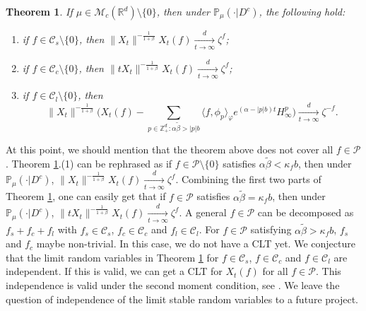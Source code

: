 \documentclass[12pt,a4paper]{amsart}
\theoremstyle{plain}
\newtheorem{thm}{Theorem}[section]
\theoremstyle{definition}
\numberwithin{equation}{section}
\begin{document}
\begin{thm}
  \label{thm:M}
 If $\mu\in \mathcal M_c(\mathbb R^d)\setminus \{0\}$, then under $\mathbb{P}_{\mu}(\cdot|D^c)$, the following hold:
\begin{enumerate}
\item
  \label{thm:M:1}
  if $f\in \mathcal C_s\setminus\{0\}$, then $\|X_t\|^{- \frac{1}{1+\beta}} X_t(f)  \xrightarrow[t\to \infty]{d} \zeta^f$;
\item
  \label{thm:M:2}
  if $f\in \mathcal C_c\setminus\{0\}$, then $ \|t X_t\|^{-\frac{1}{1+\beta}} X_t(f) \xrightarrow[t\to \infty]{d} \zeta^f$;
\item
  \label{thm:M:3}
  if $f\in \mathcal C_l\setminus\{0\}$, then
  \[
    \|X_t\|^{-\frac{1}{1+\beta}} \Big( X_t(f) - \sum_{p\in \mathbb Z^d_+:\alpha \tilde \beta>|p|b}\langle f,\phi_p\rangle_\varphi e^{(\alpha-|p|b)t}H^p_{\infty}\Big)
    \xrightarrow[t\to \infty]{d}
    \zeta^{-f}.
  \]
\end{enumerate}
\end{thm}


At this point, we should mention that the theorem above does not cover all $f\in \mathcal P$.
Theorem \ref{thm:M}.(1) can be rephrased as if $f\in \mathcal P\setminus\{0\}$ satisfies   $\alpha \tilde \beta < \kappa_f b$, then  under $\mathbb{P}_{\mu}(\cdot|D^c)$, $\|X_t\|^{- \frac{1}{1+\beta}} X_t(f)  \xrightarrow[t\to \infty]{d} \zeta^f$.
Combining the first two parts of Theorem \ref{thm:M}, one can easily get that  if $f\in \mathcal P$ satisfies   $\alpha \tilde \beta = \kappa_f b$, then  under $\mathbb{P}_{\mu}(\cdot|D^c)$,
$ \|t X_t\|^{-\frac{1}{1+\beta}} X_t(f) \xrightarrow[t\to \infty]{d} \zeta^f$.
A general  $f \in \mathcal P$ can be decomposed as $f_s + f_c + f_l$ with $f_s \in \mathcal C_s$, $f_c \in \mathcal C_c$ and $f_l \in \mathcal C_l$. 
For $f\in  \mathcal P$ satisfying $\alpha \tilde \beta > \kappa_f b$, $f_s$ and $f_c$ maybe non-trivial.
In this case, we do not have a CLT yet.
We conjecture that the limit random variables in Theorem \ref{thm:M} for $ f\in \mathcal C_s$, $f\in \mathcal C_c$ and $ f\in \mathcal C_l$ are independent. If this is valid, we can
get a CLT for $ X_t(f)$ for all $f\in  \mathcal P$.
This independence is valid  under the second moment condition, see \cite{RenSongZhang2015Central}.
We leave the question of independence of the limit stable random variables to a future project.
\end{document}
